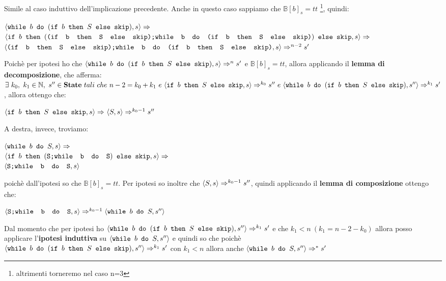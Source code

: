 {	 Simile al caso induttivo dell'implicazione precedente.
	Anche in questo caso sappiamo che $\mathbb{B}[b]_s=tt$
	\footnote{altrimenti torneremo nel caso n=3}, quindi:
	\begin{center}
	$\confSs{\wbS{b}{(\ifABC{b}{S}{\skipistr})}}{s}\Rar{}$\\
	$\confSs{
		\ifABC{b}
			{(\concat{(\ifABC{b}{S}{\skipistr})}
			{\wbS{b}{(\ifABC{b}{S}{\skipistr})}})}
			{\skipistr}
	}{s}\Rar{}$\\
	$\confSs{\concat{(\ifABC{b}{S}{\skipistr})}{\wbS{b}
	{(\ifABC{b}{S}{\skipistr})}}}{s}\Rar{n-2}s'$
	\end{center}
	Poichè per ipotesi ho che 
	$\confSs{\wbS{b}{(\ifABC{b}{S}{\skipistr})}}{s}\Rar{n}s'$ e 
	$\mathbb{B}[b]_s=tt$, allora applicando il \textbf{lemma di decomposizione},
	che afferma: $\exists{}~k_0,~k_1\in\mathbb{N},~s''\in\states~tali~che~n-2=
	k_0+k_1~e~\confSs{\ifABC{b}{S}{\skipistr}}{s}\Rar{k_0}s''~e~\confSs{\wbS{b}
	{(\ifABC{b}{S}{\skipistr})}}{s''}\Rar{k_1}s'$, allora ottengo che:
	\begin{center}
	$\confSs{\ifABC{b}{S}{\skipistr}}{s}\Rar{}\confSs{S}{s}\Rar{k_0-1}s''$
	\end{center}
	A destra, invece, troviamo:
	\begin{center}
	$\confSs{\wbS{b}{S}}{s}\Rar{}$\\
	$\confSs{
		\ifABC{b}
		{(\concat{S}
		{\wbS{b}{S}})}
		{\skipistr}}{s}\Rar{}$\\
	$\confSs{{\concat{S}{\wbS{b}{S}}}}{s}$
	\end{center}
	poichè dall'ipotesi so che $\mathbb{B}[b]_s=tt$. Per ipotesi so inoltre che
	$\confSs{S}{s}\Rar{k_0-1}s''$, quindi applicando il \textbf{lemma di
	composizione} ottengo che:
	\begin{center}
	$\confSs{{\concat{S}{\wbS{b}{S}}}}{s}\Rar{k_0-1}\confSs{\wbS{b}{S}}{s''}$
	\end{center}
	Dal momento che per ipotesi ho $\confSs{\wbS{b}{(\ifABC{b}{S}
	{\skipistr})}}{s''}\Rar{k_1}s'$ e che $k_1<n~(k_1=n-2-k_0)$ allora posso
	applicare l'\textbf{ipotesi induttiva} su $\confSs{\wbS{b}{S}}{s''}$ e
	quindi so che poichè \\ $\confSs{\wbS{b}{(\ifABC{b}{S}{\skipistr})}}
	{s''}\Rar{k_1}s'$ con $k_1<n$ allora anche 
	$\confSs{\wbS{b}{S}}{s''}\Rar{*}s'$
}
\newpage
